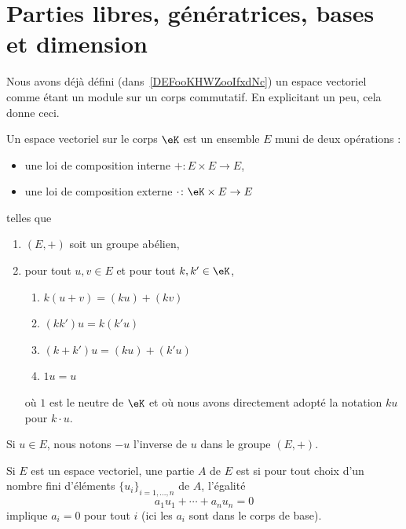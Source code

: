 
\section{Parties libres, génératrices, bases et dimension}

\begin{normaltext}		\label{NORMooANZNooTUhDdk}
	Nous avons déjà défini (dans~\ref{DEFooKHWZooIfxdNc}) un espace vectoriel comme étant un module sur un corps commutatif. En explicitant un peu, cela donne ceci\cite{ooQLVLooEUrNLS}.

	Un espace vectoriel sur le corps \( \eK\) est un ensemble \( E\) muni de deux opérations :
	\begin{itemize}
		\item une loi de composition interne \( +\colon E\times E\to E\),
		\item une loi de composition externe \( \cdot\colon \eK\times E\to E\)
	\end{itemize}
	telles que
	\begin{enumerate}
		\item
		      \( (E,+)\) soit un groupe abélien,
		\item
		      pour tout \( u,v\in E\) et pour tout \( k,k'\in \eK\),
		      \begin{enumerate}
			      \item		\label{ITEMooYQMWooNNvHSb}
			            \( k(u+v)=(ku)+(kv)\)
			      \item
			            \( (kk')u=k(k'u)\)
			      \item
			            \( (k+k')u=(ku)+(k'u)\)
			      \item
			            \( 1u=u\)
		      \end{enumerate}
		      où \( 1\) est le neutre de \( \eK\) et où nous avons directement adopté la notation \( ku\) pour \( k\cdot u\).
	\end{enumerate}
	Si \( u\in E\), nous notons \( -u\) l'inverse de \( u\) dans le groupe \( (E,+)\).
\end{normaltext}

\begin{definition}		\label{DEFooDLHWooAvfhgc}
	Si \( E\) est un espace vectoriel, une partie \( A\) de \( E\) est  si pour tout choix d'un nombre fini d'éléments \( \{ u_i \}_{i=1,\ldots, n}\) de \( A\), l'égalité
	\begin{equation}
		a_1 u_1+\cdots +a_nu_n=0
	\end{equation}
	implique \( a_i=0\) pour tout \( i\) (ici les \( a_i\) sont dans le corps de base).
\end{definition}

